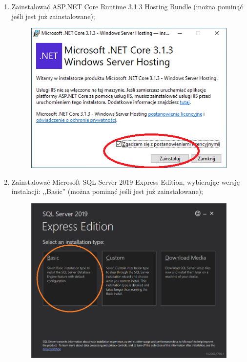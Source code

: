 \documentclass[12pt,a4paper]{article}
\begin{document}
\begin{enumerate}
				\item Zainstalować ASP.NET Core Runtime 3.1.3 Hosting Bundle (można pominąć jeśli jest już zainstalowane);
					\begin{figure}[H]
						\centering
						\includegraphics[scale=0.5]{img/Local_Install_3.png}
					\end{figure}
					
				\item Zainstalować Microsoft SQL Server 2019 Express Edition, wybierając wersję instalacji: ,,Basic'' (można pominąć jeśli jest już zainstalowane);
					\begin{figure}[H]
						\centering
						\includegraphics[scale=0.3]{img/Local_Install_4.png}
					\end{figure}
					

\end{enumerate}
\end{document}
